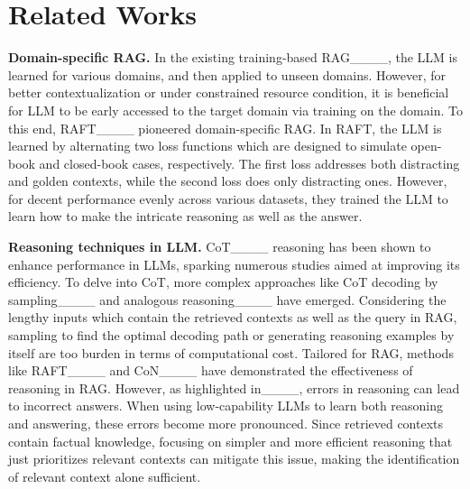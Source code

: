 \section{Related Works}
\vspace{-0.2cm}
\noindent \textbf{Domain-specific RAG.}
In the existing training-based RAG____, the LLM is learned for various domains, and then applied to unseen domains. However, for better contextualization or under constrained resource condition, it is beneficial for LLM to be early accessed to the target domain via training on the domain. To this end, RAFT____ pioneered domain-specific RAG. In RAFT, the LLM is learned by alternating two loss functions which are designed to simulate open-book and closed-book cases, respectively. The first loss addresses both distracting and golden contexts, while the second loss does only distracting ones. However, for decent performance evenly across various datasets, they trained the LLM to learn how to make the intricate reasoning as well as the answer.  

\noindent \textbf{Reasoning techniques in LLM.}
CoT____ reasoning has been shown to enhance performance in LLMs, sparking numerous studies aimed at improving its efficiency. To delve into CoT, more complex approaches like CoT decoding by sampling____ and analogous reasoning____ have emerged. Considering the lengthy inputs which contain the retrieved contexts as well as the query in RAG, sampling to find the optimal decoding path or generating reasoning examples by itself are too burden in terms of computational cost. Tailored for RAG, methods like RAFT____ and CoN____ have demonstrated the effectiveness of reasoning in RAG. However, as highlighted in____, errors in reasoning can lead to incorrect answers. When using low-capability LLMs to learn both reasoning and answering, these errors become more pronounced. Since retrieved contexts contain factual knowledge, focusing on simpler and more efficient reasoning that just prioritizes relevant contexts can mitigate this issue, making the identification of relevant context alone sufficient.

